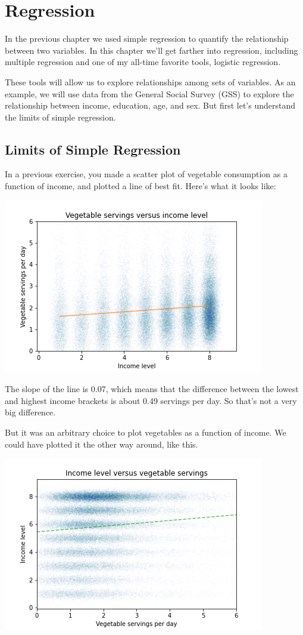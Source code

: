 \hypertarget{regression}{%
\chapter{Regression}\label{regression}}

In the previous chapter we used simple regression to quantify the
relationship between two variables. In this chapter we'll get farther
into regression, including multiple regression and one of my all-time
favorite tools, logistic regression.

These tools will allow us to explore relationships among sets of
variables. As an example, we will use data from the General Social
Survey (GSS) to explore the relationship between income, education, age,
and sex. But first let's understand the limits of simple regression.

\hypertarget{limits-of-simple-regression}{%
\section{Limits of Simple
Regression}\label{limits-of-simple-regression}}

In a previous exercise, you made a scatter plot of vegetable consumption
as a function of income, and plotted a line of best fit. Here's what it
looks like:

\includegraphics{figs/fig09-01.png}

The slope of the line is 0.07, which means that the difference between
the lowest and highest income brackets is about 0.49 servings per day.
So that's not a very big difference.

But it was an arbitrary choice to plot vegetables as a function of
income. We could have plotted it the other way around, like this.

\includegraphics{figs/fig09-02.png}

